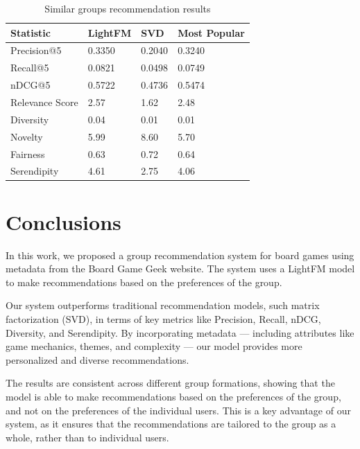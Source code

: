 \documentclass{article}
\begin{document}
\begin{table}[]
    \centering
    \begin{tabular}{|l|l|l|l|}
        \hline
        \textbf{Statistic} & \textbf{LightFM} & \textbf{SVD} & \textbf{Most Popular} \\ \hline
        Precision@5        & 0.3350           & 0.2040       & 0.3240                \\
        Recall@5           & 0.0821           & 0.0498       & 0.0749                \\
        nDCG@5             & 0.5722           & 0.4736       & 0.5474                \\
        Relevance Score    & 2.57             & 1.62         & 2.48                  \\
        Diversity          & 0.04             & 0.01         & 0.01                  \\
        Novelty            & 5.99             & 8.60         & 5.70                  \\
        Fairness           & 0.63             & 0.72         & 0.64                  \\
        Serendipity        & 4.61             & 2.75         & 4.06                  \\ \hline
    \end{tabular}
    \caption{Similar groups recommendation results}
    \label{tab:resultados-modelos-similar}
\end{table}

\section{Conclusions}

In this work, we proposed a group recommendation system for board games using metadata from the Board Game Geek website. The system uses a LightFM model to make recommendations based on the preferences of the group. 

Our system outperforms traditional recommendation models, such matrix factorization (SVD), in terms of key metrics like Precision, Recall, nDCG, Diversity, and Serendipity. By incorporating metadata — including attributes like game mechanics, themes, and complexity — our model provides more personalized and diverse recommendations.

The results are consistent across different group formations, showing that the model is able to make recommendations based on the preferences of the group, and not on the preferences of the individual users. This is a key advantage of our system, as it ensures that the recommendations are tailored to the group as a whole, rather than to individual users.
\end{document}
